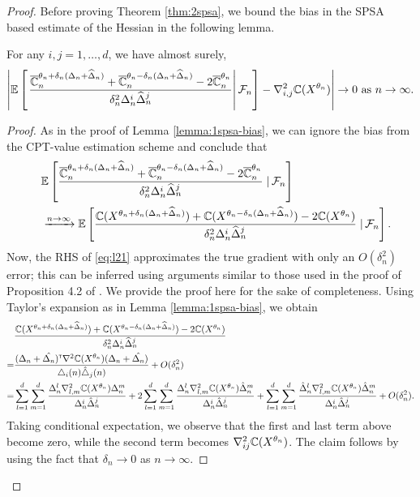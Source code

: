 \documentclass{article}
\numberwithin{equation}{section}
\numberwithin{theorem}{section}
\begin{document}
\begin{proof}
Before proving Theorem \ref{thm:2spsa}, we bound the bias in the SPSA based estimate of the Hessian in the following lemma.
\begin{lemma}
\label{lemma:2spsa-bias}
For any $i, j= 1,\ldots,d$, we have almost surely,  
\begin{align}
    \left| \mathbb{E}\left[\left.\dfrac{\overline {\mathbb{C}}_n^{\theta_n+\delta_n(\Delta_n+\widehat\Delta_n)} + \overline {\mathbb{C}}_n^{\theta_n-\delta_n(\Delta_n+\widehat\Delta_n)} - 2 \overline {\mathbb{C}}_n^{\theta_n}}{\delta_n^2 \Delta_n^{i}\widehat\Delta_n^j}\right| \mathcal{F}_n \right] - \nabla^2_{i,j} \mathbb{C}(X^{\theta_n}) \right| \rightarrow 0 \text{ as } n\rightarrow\infty.
\end{align} 
\end{lemma}
\begin{proof}
As in the proof of Lemma \ref{lemma:1spsa-bias}, we can ignore the bias from the CPT-value estimation scheme and conclude that
\begin{align}
    \quad&\mathbb{E}\left[\dfrac{\overline {\mathbb{C}}_n^{\theta_n+\delta_n(\Delta_n+\widehat\Delta_n)} + \overline {\mathbb{C}}_n^{\theta_n-\delta_n(\Delta_n+\widehat\Delta_n)} - 2\overline {\mathbb{C}}_n^{\theta_n}}{\delta_n^2 \Delta_n^i\widehat\Delta_n^j} \left.\right| \mathcal{F}_n\right] \nonumber\\
     &\xrightarrow{n\rightarrow\infty}  \mathbb{E}\left[\dfrac{\mathbb{C}(X^{\theta_n+\delta_n(\Delta_n+\widehat\Delta_n)}) + \mathbb{C}(X^{\theta_n-\delta_n(\Delta_n+\widehat\Delta_n)}) - 2\mathbb{C}(X^{\theta_n})}{\delta_n^2 \Delta_n^i\widehat\Delta_n^j} \left.\right| \mathcal{F}_n\right].  \label{eq:l21}
\end{align}
Now, the RHS of \eqref{eq:l21} approximates the true gradient with only an $O(\delta_n^2)$ error; this can be inferred using arguments similar to those used in the proof of Proposition 4.2 of \cite{bhatnagar2015simultaneous}. We provide the proof here for the sake of completeness.
Using Taylor's expansion as in Lemma \ref{lemma:1spsa-bias}, we obtain
\begin{align*}
&\dfrac{\mathbb{C}(X^{\theta_n+\delta_n(\Delta_n+\widehat\Delta_n)}) + \mathbb{C}(X^{\theta_n-\delta_n(\Delta_n+\widehat\Delta_n)}) - 2\mathbb{C}(X^{\theta_n})}{\delta_n^2 \Delta_n^i\widehat\Delta_n^j}\\
=&  \frac{(\Delta_n+\hat{\Delta_n})^\mathsf{\scriptscriptstyle T} \nabla^2 \mathbb{C}(X^{\theta_n})(\Delta_n
+\hat{\Delta_n})}{\triangle_i(n)\hat{\triangle}_j(n)}
+ O(\delta_n^2) \\
=& \sum_{l=1}^{d}\sum_{m=1}^{d} \frac{\Delta_n^l\nabla^2_{l,m}\mathbb{C}(X^{\theta_n})\Delta_n^m}{\Delta_n^i
\hat{\Delta}_n^j} + 2\sum_{l=1}^{d}\sum_{m=1}^{d} \frac{\Delta_n^l\nabla^2_{l,m}
\mathbb{C}(X^{\theta_n})\hat{\Delta}_n^m}{\Delta_n^i
\hat{\Delta}_n^j}+ \sum_{l=1}^{d}\sum_{m=1}^{d} \frac{\hat{\Delta}_n^l\nabla^2_{l,m}\mathbb{C}(X^{\theta_n})\hat{\Delta}_n^m}{\Delta_n^i
\hat{\Delta}_n^j} + O(\delta_n^2).
\end{align*}
Taking conditional expectation, we observe that the first and last term above become zero, while the second term becomes $\nabla^2_{ij}
\mathbb{C}(X^{\theta_n})$. The claim follows by using the fact that $\delta_n \rightarrow 0$ as $n\rightarrow \infty$.
\end{proof}


\end{proof}
\end{document}
